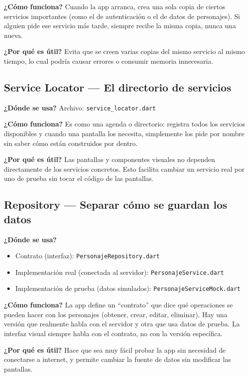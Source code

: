 \documentclass[12pt,a4paper]{article}
\begin{document}
\textbf{¿Cómo funciona?} Cuando la app arranca, crea una sola copia de ciertos servicios importantes (como el de autenticación o el de datos de personajes). Si alguien pide ese servicio más tarde, siempre recibe la misma copia, nunca una nueva.

\textbf{¿Por qué es útil?} Evita que se creen varias copias del mismo servicio al mismo tiempo, lo cual podría causar errores o consumir memoria innecesaria.

\subsection{Service Locator — El directorio de servicios}
\textbf{¿Dónde se usa?} Archivo: \texttt{service\_locator.dart}

\textbf{¿Cómo funciona?} Es como una agenda o directorio: registra todos los servicios disponibles y cuando una pantalla los necesita, simplemente los pide por nombre sin saber cómo están construidos por dentro.

\textbf{¿Por qué es útil?} Las pantallas y componentes visuales no dependen directamente de los servicios concretos. Esto facilita cambiar un servicio real por uno de prueba sin tocar el código de las pantallas.

\subsection{Repository — Separar cómo se guardan los datos}
\textbf{¿Dónde se usa?}
\begin{itemize}[leftmargin=1.2cm]
  \item Contrato (interfaz): \texttt{PersonajeRepository.dart}
  \item Implementación real (conectada al servidor): \texttt{PersonajeService.dart}
  \item Implementación de prueba (datos simulados): \texttt{PersonajeServiceMock.dart}
\end{itemize}

\textbf{¿Cómo funciona?} La app define un ``contrato'' que dice qué operaciones se pueden hacer con los personajes (obtener, crear, editar, eliminar). Hay una versión que realmente habla con el servidor y otra que usa datos de prueba. La interfaz visual siempre habla con el contrato, no con la versión específica.

\textbf{¿Por qué es útil?} Hace que sea muy fácil probar la app sin necesidad de conectarse a internet, y permite cambiar la fuente de datos sin modificar las pantallas.
\end{document}
